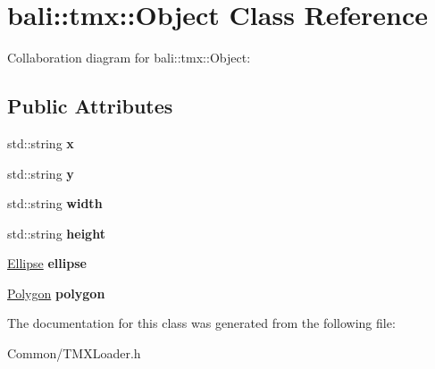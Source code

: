 \hypertarget{classbali_1_1tmx_1_1_object}{\section{bali\-:\-:tmx\-:\-:Object Class Reference}
\label{classbali_1_1tmx_1_1_object}
}


Collaboration diagram for bali\-:\-:tmx\-:\-:Object\-:
\subsection*{Public Attributes}
\begin{DoxyCompactItemize}
\item 
\hypertarget{classbali_1_1tmx_1_1_object_aa627b015e628949bb2c2e55a1cd8994b}{std\-::string {\bfseries x}}\label{classbali_1_1tmx_1_1_object_aa627b015e628949bb2c2e55a1cd8994b}

\item 
\hypertarget{classbali_1_1tmx_1_1_object_a8375e2ffb10df3aef1f15c00b9dc05f9}{std\-::string {\bfseries y}}\label{classbali_1_1tmx_1_1_object_a8375e2ffb10df3aef1f15c00b9dc05f9}

\item 
\hypertarget{classbali_1_1tmx_1_1_object_a8b6d9b81afde9c27b142bf79e59e3164}{std\-::string {\bfseries width}}\label{classbali_1_1tmx_1_1_object_a8b6d9b81afde9c27b142bf79e59e3164}

\item 
\hypertarget{classbali_1_1tmx_1_1_object_a4e2232347bf7e89466f6c807abf80768}{std\-::string {\bfseries height}}\label{classbali_1_1tmx_1_1_object_a4e2232347bf7e89466f6c807abf80768}

\item 
\hypertarget{classbali_1_1tmx_1_1_object_aa1516ad73ff6bcd4a100d00852c22d17}{\hyperlink{classbali_1_1tmx_1_1_ellipse}{Ellipse} {\bfseries ellipse}}\label{classbali_1_1tmx_1_1_object_aa1516ad73ff6bcd4a100d00852c22d17}

\item 
\hypertarget{classbali_1_1tmx_1_1_object_a474ddee5f84a16bab5233b5d2abb91fc}{\hyperlink{classbali_1_1tmx_1_1_polygon}{Polygon} {\bfseries polygon}}\label{classbali_1_1tmx_1_1_object_a474ddee5f84a16bab5233b5d2abb91fc}

\end{DoxyCompactItemize}


The documentation for this class was generated from the following file\-:\begin{DoxyCompactItemize}
\item 
Common/T\-M\-X\-Loader.\-h\end{DoxyCompactItemize}
